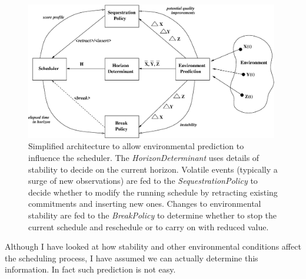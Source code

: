    \begin{figure}[htp]
   \begin{center}
   \includegraphics[height=6cm]{figures/las_feedback.eps}
   \end{center}
 
   \caption[Environmental prediction in scheduling architecture.] 
   {Simplified architecture to allow environmental prediction to influence the scheduler. The \emph{HorizonDeterminant} uses details of stability to decide on the current horizon. Volatile events (typically a surge of new observations) are fed to the \emph{SequestrationPolicy} to decide whether to modify the running schedule by retracting existing commitments and inserting new ones. Changes to environmental stability are fed to the \emph{BreakPolicy} to determine whether to stop the current schedule and reschedule or to carry on with reduced value.}
   \label{fig:las_feedback} 
   \end{figure} 


 Although I have looked at how stability and other environmental conditions affect the scheduling process, I have assumed we can actually determine this information. In fact such prediction is not easy.


